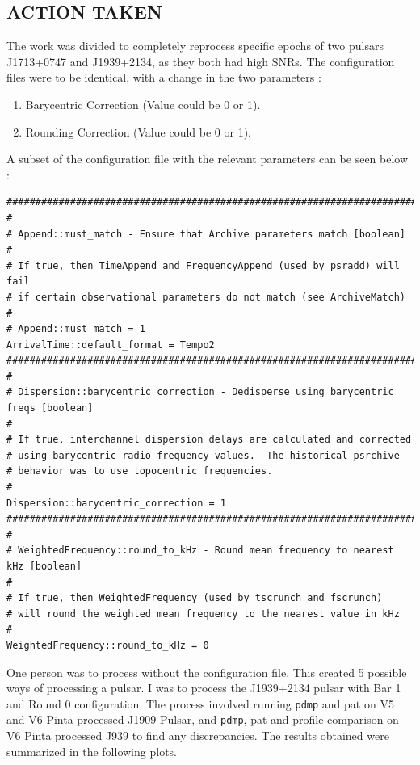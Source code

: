 \documentclass{article}
\begin{document}
\subsection{ACTION TAKEN}
The work was divided to completely reprocess specific epochs of two pulsars J1713+0747 and J1939+2134, as they both had high SNRs. The configuration files were to be identical, with a change in the two parameters : 
\begin{enumerate}
    \item Barycentric Correction (Value could be 0 or 1). 
    \item Rounding Correction (Value could be 0 or 1). 
\end{enumerate}
A subset of the configuration file with the relevant parameters can be seen below :
\begin{lstlisting}
###########################################################################
#
# Append::must_match - Ensure that Archive parameters match [boolean]
#
# If true, then TimeAppend and FrequencyAppend (used by psradd) will fail
# if certain observational parameters do not match (see ArchiveMatch)
#
# Append::must_match = 1
ArrivalTime::default_format = Tempo2
###########################################################################
#
# Dispersion::barycentric_correction - Dedisperse using barycentric freqs [boolean]
#
# If true, interchannel dispersion delays are calculated and corrected
# using barycentric radio frequency values.  The historical psrchive
# behavior was to use topocentric frequencies.
#
Dispersion::barycentric_correction = 1
###########################################################################
#
# WeightedFrequency::round_to_kHz - Round mean frequency to nearest kHz [boolean]
#
# If true, then WeightedFrequency (used by tscrunch and fscrunch)
# will round the weighted mean frequency to the nearest value in kHz
#
WeightedFrequency::round_to_kHz = 0
\end{lstlisting}
One person was to process without the configuration file. This created 5 possible ways of processing a pulsar. I was to process the J1939+2134 pulsar with Bar 1 and Round 0 configuration. The process involved running {\tt pdmp} and pat on V5 and V6 Pinta processed J1909 Pulsar, and {\tt pdmp}, pat and profile comparison on V6 Pinta processed J939 to find any discrepancies. The results obtained were summarized in the following plots.
\end{document}
